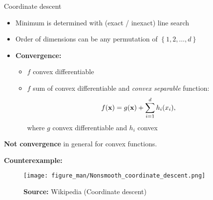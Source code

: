 \documentclass[11pt,compress,t,notes=noshow, xcolor=table]{beamer}
\begin{document}
\begin{vbframe}{Coordinate descent}
\begin{itemize}
    \item Minimum is determined with (exact / inexact) line search
    \item Order of dimensions can be any permutation of $\left\{1,2,\ldots,d\right\}$
    \item \textbf{Convergence:}
        \begin{itemize}
            \item $f$ convex differentiable
            \item $f$ sum of convex differentiable and \textit{convex separable} function:
                \begin{equation*}
                    f(\mathbf{x}) = g(\mathbf{x}) + \sum_{i=1}^d h_i(x_i),
                \end{equation*}
                where $g$ convex differentiable and $h_i$ convex
        \end{itemize}
\end{itemize}

\framebreak

\textbf{Not convergence} in general for convex functions.

\medskip

\textbf{Counterexample:}

\begin{figure}
    \centering
    \texttt{[image: figure\_man/Nonsmooth\_coordinate\_descent.png]}
    \caption*{\small \textbf{Source:} Wikipedia (Coordinate descent)}
\end{figure}




%
%



\end{vbframe}
\end{document}

